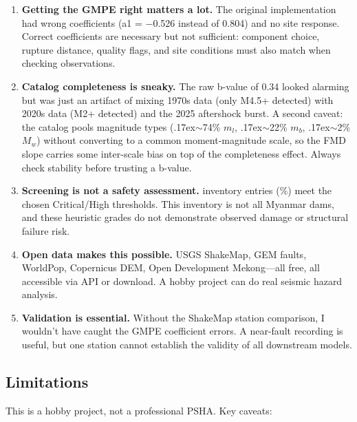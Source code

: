 \documentclass[11pt,a4paper]{article}
\begin{document}
\begin{enumerate}
    \item \textbf{Getting the GMPE right matters a lot.}
    The original implementation had wrong coefficients (a1 = $-$0.526 instead of 0.804) and no site response.
    Correct coefficients are necessary but not sufficient: component choice, rupture distance, quality flags, and site conditions must also match when checking observations.

    \item \textbf{Catalog completeness is sneaky.}
    The raw b-value of 0.34 looked alarming but was just an artifact of mixing 1970s data (only M4.5+ detected) with 2020s data (M2+ detected) and the 2025 aftershock burst.
    A second caveat: the catalog pools magnitude types (\raise.17ex\hbox{$\scriptstyle\sim$}74\% $m_l$, \raise.17ex\hbox{$\scriptstyle\sim$}22\% $m_b$, \raise.17ex\hbox{$\scriptstyle\sim$}2\% $M_w$) without converting to a common moment-magnitude scale, so the FMD slope carries some inter-scale bias on top of the completeness effect.
    Always check stability before trusting a b-value.

    \item \textbf{Screening is not a safety assessment.}
    \HighCount{} inventory entries (\HighPercent\%) meet the chosen Critical/High thresholds. This inventory is not all Myanmar dams, and these heuristic grades do not demonstrate observed damage or structural failure risk.

    \item \textbf{Open data makes this possible.}
    USGS ShakeMap, GEM faults, WorldPop, Copernicus DEM, Open Development Mekong---all free, all accessible via API or download.
    A hobby project can do real seismic hazard analysis.

    \item \textbf{Validation is essential.}
    Without the ShakeMap station comparison, I wouldn't have caught the GMPE coefficient errors.
    A near-fault recording is useful, but one station cannot establish the validity of all downstream models.
\end{enumerate}

\subsection{Limitations}

This is a hobby project, not a professional PSHA. Key caveats:
\end{document}
